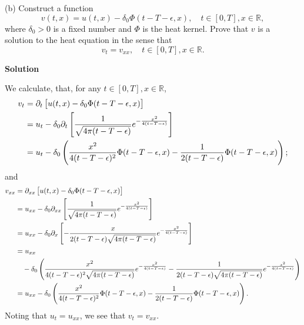 \documentclass{article}
\begin{document}
\vspace{5mm}

(b) Construct a function
%
\begin{equation*}
    v(t, x) = u(t, x) - \delta_0 \Phi(t - T - \epsilon, x),
    \quad t \in [0, T], x \in \mathbb{R}
    ,
\end{equation*}
%
where $\delta_0 > 0$ is a fixed number and $\Phi$ is the heat kernel.
Prove that $v$ is a solution to the heat equation in the sense that
%
\begin{equation*}
    v_t = v_{xx},
    \quad t \in [0, T], x \in \mathbb{R}
    .
\end{equation*}

\textbf{Solution}

We calculate, that, for any $t \in [0, T], x \in \mathbb{R}$,
%
\begin{align*}
    v_t &= \partial_t \sbr{u(t, x) - \delta_0 \Phi(t - T - \epsilon, x)} \\
        &= u_t - \delta_0 \partial_t
            \sbr{
                \frac{1}{\sqrt{4 \pi (t - T - \epsilon)}}
                e^{- \frac{x^2}{4 (t - T - \epsilon)}}
            } \\
        &= u_t - \delta_0
            \del{
                \frac{x^2}{4 (t - T - \epsilon)^2} \Phi(t - T - \epsilon, x)
                - \frac{1}{2 (t - T - \epsilon)} \Phi(t - T - \epsilon, x)
            }
        ;
\end{align*}
%
and
%
\begin{align*}
    v_{xx} &= \partial_{xx} \sbr{u(t, x) - \delta_0 \Phi(t - T - \epsilon, x)} \\
           &= u_{xx} - \delta_0 \partial_{xx}
            \sbr{
                \frac{1}{\sqrt{4 \pi (t - T - \epsilon)}}
                e^{- \frac{x^2}{4 (t - T - \epsilon)}}
            } \\
           &= u_{xx} - \delta_0 \partial_x
            \sbr{
                - \frac{x}{2 (t - T - \epsilon) \sqrt{4 \pi (t - T - \epsilon)}}
                e^{- \frac{x^2}{4 (t - T - \epsilon)}}
            } \\
           &= u_{xx} \\
           &\quad - \delta_0
            \del{
                \frac{x^2}{4 (t - T - \epsilon)^2 \sqrt{4 \pi (t - T - \epsilon)}}
                e^{- \frac{x^2}{4 (t - T - \epsilon)}}
                - \frac{1}{2 (t - T - \epsilon) \sqrt{4 \pi (t - T - \epsilon)}}
                e^{- \frac{x^2}{4 (t - T - \epsilon)}}
            } \\
           &= u_{xx} - \delta_0
            \del{
                \frac{x^2}{4 (t - T - \epsilon)^2} \Phi(t - T - \epsilon, x)
                - \frac{1}{2 (t - T - \epsilon)} \Phi(t - T - \epsilon, x)
            }
        .
\end{align*}
%
Noting that $u_t = u_{xx}$, we see that $v_t = v_{xx}$.
\end{document}
